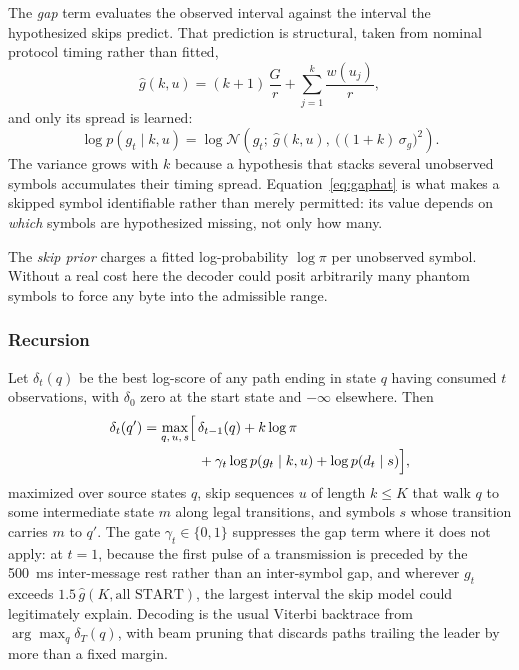 The \emph{gap} term evaluates the observed interval against the interval the
hypothesized skips predict. That prediction is structural, taken from nominal
protocol timing rather than fitted,
\begin{equation}
\hat{g}(k, u) = (k+1)\,\frac{G}{r} + \sum_{j=1}^{k} \frac{w(u_j)}{r},
\label{eq:gaphat}
\end{equation}
and only its spread is learned:
\begin{equation}
\log p(g_t \mid k, u) = \log \mathcal{N}\!\left(g_t;\ \hat{g}(k,u),\
  \bigl((1+k)\,\sigma_g\bigr)^2\right).
\label{eq:gap}
\end{equation}
The variance grows with $k$ because a hypothesis that stacks several
unobserved symbols accumulates their timing spread. Equation~\eqref{eq:gaphat}
is what makes a skipped symbol identifiable rather than merely permitted: its
value depends on \emph{which} symbols are hypothesized missing, not only how
many.

The \emph{skip prior} charges a fitted log-probability $\log\pi$ per unobserved
symbol. Without a real cost here the decoder could posit arbitrarily many
phantom symbols to force any byte into the admissible range.

\subsubsection{Recursion}

Let $\delta_t(q)$ be the best log-score of any path ending in state $q$ having
consumed $t$ observations, with $\delta_0$ zero at the start state and
$-\infty$ elsewhere. Then
\begin{equation}
\begin{split}
\delta_t(q') = \max_{q,\,u,\,s}\Bigl[\,&\delta_{t-1}(q) + k\log\pi \\
  &+ \gamma_t \log p(g_t \mid k,u) + \log p(d_t \mid s)\Bigr],
\end{split}
\label{eq:viterbi}
\end{equation}
maximized over source states $q$, skip sequences $u$ of length $k \le K$ that
walk $q$ to some intermediate state $m$ along legal transitions, and symbols
$s$ whose transition carries $m$ to $q'$. The gate $\gamma_t \in \{0,1\}$
suppresses the gap term where it does not apply: at $t=1$, because the first
pulse of a transmission is preceded by the 500~ms inter-message rest rather
than an inter-symbol gap, and wherever $g_t$ exceeds $1.5\,\hat{g}(K, \text{all
START})$, the largest interval the skip model could legitimately explain.
Decoding is the usual Viterbi backtrace from $\arg\max_q \delta_T(q)$, with
beam pruning that discards paths trailing the leader by more than a fixed
margin.

